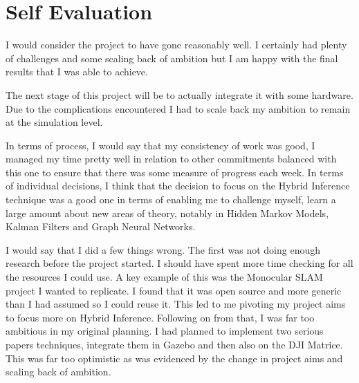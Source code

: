 \documentclass[]{../resources/final_report}
\begin{document}




\section{Self Evaluation}

I would consider the project to have gone reasonably well. I certainly had plenty of 
challenges and some scaling back of ambition but I am happy with the final results that 
I was able to achieve.


The next stage of this project will be to actually integrate it with some hardware.
Due to the complications encountered I had to scale back my ambition to remain at the
simulation level.


In terms of process, I would say that my consistency of work was good, I managed my time
pretty well in relation to other commitments balanced with this one to ensure that there 
was some measure of progress each week.
In terms of individual decisions, I think that the decision to focus on the Hybrid Inference 
technique was a good one in terms of enabling me to challenge myself, learn a large amount 
about new areas of theory, notably in Hidden Markov Models, Kalman Filters and Graph Neural Networks.

I would say that I did a few things wrong. The first was not doing enough research before the
project started. I should have spent more time checking for all the resources I could use. 
A key example of this was the Monocular SLAM project I wanted to replicate. I found that it was 
open source and more generic than I had assumed so I could reuse it. This led to me pivoting
my project aims to focus more on Hybrid Inference.
Following on from that, I was far too ambitious in my original planning. I had planned to 
implement two serious papers techniques, integrate them in Gazebo and then also on the DJI
Matrice. This was far too optimistic as was evidenced by the change in project aims and
scaling back of ambition.
\end{document}
